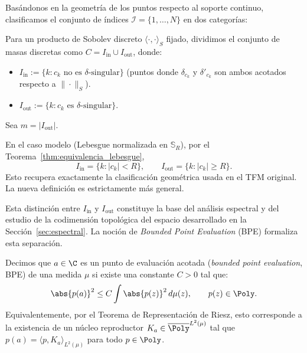 Basándonos en la geometría de los puntos respecto al soporte continuo, clasificamos el conjunto de índices $\mathcal{I} = \{1, \dots, N\}$ en dos categorías:

\begin{defn}\label{def:class_points_new}
	Para un producto de Sobolev discreto $\langle\cdot,\cdot\rangle_S$
	fijado, dividimos el conjunto de masas discretas como
	$C=I_{\mathrm{in}}\cup I_{\mathrm{out}}$, donde:
	\begin{itemize}
		\item $I_{\mathrm{in}}:=\{k:c_k\text{ no es }\delta\text{-singular}\}$
		      (puntos donde $\delta_{c_k}$ y $\delta'_{c_k}$ son ambos acotados
		      respecto a $\|\cdot\|_S$).
		\item $I_{\mathrm{out}}:=\{k:c_k\text{ es }\delta\text{-singular}\}$.
	\end{itemize}
	Sea $m=|I_{\mathrm{out}}|$.
\end{defn}

\begin{rmk}\label{rem:compatibilidad_class_points}
	En el caso modelo (Lebesgue normalizada en $\mathbb{S}_R$), por el
	Teorema~\ref{thm:equivalencia_lebesgue},
	\[
		I_{\mathrm{in}}=\{k:|c_k|<R\},\qquad I_{\mathrm{out}}=\{k:|c_k|\ge R\}.
	\]
	Esto recupera exactamente la clasificación geométrica usada en el TFM
	original. La nueva definición es estrictamente más general.
\end{rmk}

Esta distinción entre $I_{\mathrm{in}}$ y $I_{\mathrm{out}}$ constituye la base del análisis espectral y del estudio de la codimensión topológica del espacio desarrollado en la Sección~\ref{sec:espectral}. La noción de \textit{Bounded Point Evaluation} (BPE) formaliza esta separación.

\begin{defn}
	Decimos que $a \in \C$ es un punto de evaluación acotada (\textit{bounded point evaluation}, BPE) de una medida $\mu$ \cite{miller1999bounded,aleman2009nontangential} si existe una constante $C > 0$ tal que:
	\begin{equation}
		\abs{p(a)}^2 \leq C \int \abs{p(z)}^2 \, d\mu(z), \qquad p(z) \in \Poly.
	\end{equation}
	Equivalentemente, por el Teorema de Representación de Riesz, esto corresponde a la existencia de un núcleo reproductor $K_a \in \overline{\Poly}^{L^2(\mu)}$ tal que $p(a) = \langle p, K_a \rangle_{L^2(\mu)}$ para todo $p \in \Poly$.
\end{defn}

